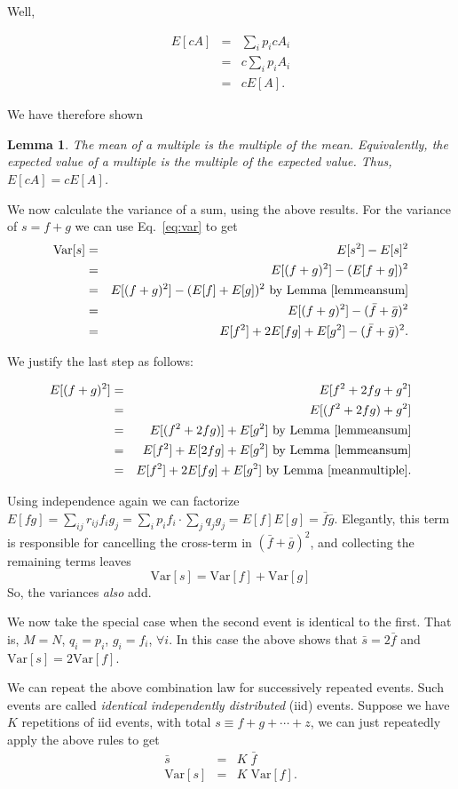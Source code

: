 \documentclass[12pt,letterpaper]{report}
\newcommand\be{\begin{equation}}
\newcommand\ee{\end{equation}}
\newcommand\bea{\begin{eqnarray}}
\newcommand\eea{\end{eqnarray}}
\newtheorem{lem}[thm]{Lemma}
\newcommand{\var}{\text{Var}}
\begin{document}
Well,

\bea E[cA] &=& \sum_i p_i cA_i \nonumber\\ &=& c \sum_i p_i A_i
\nonumber\\ &=& c E[A]. \eea

We have therefore shown

\begin{lem}\label{meanmultiple}The mean of a multiple is the multiple of the mean.
Equivalently, the expected value of a multiple is the multiple of
the expected value. Thus, $E[cA] = cE[A]$.
\end{lem}

We now calculate the variance of a sum, using the above results.
For the variance of $s = f + g$ we can use Eq.~\ref{eq:var} to get
\bea \var[s] &=& E[s^2] - E[s]^2 \nonumber \\
    &=& E[(f+g)^2] - (E[f+g])^2 \nonumber\\
    &=& E[(f+g)^2] - (E[f] + E[g])^2 \ \mbox{by Lemma
    \ref{lemmeansum}} \nonumber\\
    &=& E[(f + g)^2] - (\bar{f}+\bar{g})^2 \nonumber \\
    &=& E[f^2] + 2E[fg] + E[g^2] -(\bar{f}+\bar{g})^2.
\eea

We justify the last step as follows:

\bea E[(f+g)^2] &=& E[f^2 + 2fg + g^2] \nonumber\\ &=& E[(f^2 +
2fg) + g^2] \nonumber\\ &=& E[(f^2 + 2fg)] + E[g^2] \ \mbox{by
Lemma \ref{lemmeansum}} \nonumber\\ &=& E[f^2] + E[2fg] + E[g^2] \
\mbox{by Lemma \ref{lemmeansum}} \nonumber\\ &=& E[f^2] + 2E[fg] +
E[g^2] \ \mbox{by Lemma \ref{meanmultiple}}. \eea

Using independence again we can factorize $E[fg] = \sum_{ij}
r_{ij} f_i g_j = \sum_i p_i f_i \cdot \sum_j q_j g_j = E[f] E[g] =
\bar{f}\bar{g}$. Elegantly, this term is responsible for
cancelling the cross-term in $(\bar{f}+\bar{g})^2$, and collecting
the remaining terms leaves \be \var[s] = \var[f] + \var[g] \ee So,
the variances {\em also} add.

We now take the special case when the second event is identical to
the first. That is, $M=N$, $q_i = p_i$, $g_i = f_i$, $\forall i$.
In this case the above shows that $\bar{s} = 2\bar{f}$ and
$\var[s] = 2\var[f]$.

We can repeat the above combination law for successively repeated
events. Such events are called {\em identical independently
distributed} (iid) events. Suppose we have $K$ repetitions of iid
events, with total $s \equiv f + g + \cdots + z$,
we can just repeatedly apply the above rules to get \bea
\bar{s} & = & K \;\bar{f} \\
\var[s] & = & K \; \var[f]. \eea
\end{document}
